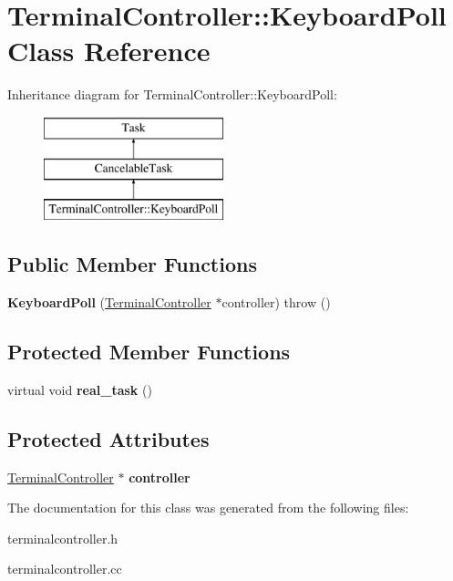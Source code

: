 \hypertarget{classTerminalController_1_1KeyboardPoll}{
\section{TerminalController::KeyboardPoll Class Reference}
\label{classTerminalController_1_1KeyboardPoll}
}
Inheritance diagram for TerminalController::KeyboardPoll:\begin{figure}[H]
\begin{center}
\leavevmode
\includegraphics[height=3cm]{classTerminalController_1_1KeyboardPoll}
\end{center}
\end{figure}
\subsection*{Public Member Functions}
\begin{DoxyCompactItemize}
\item 
\hypertarget{classTerminalController_1_1KeyboardPoll_a5367155da125738f1a92d91a602390f9}{
{\bfseries KeyboardPoll} (\hyperlink{classTerminalController}{TerminalController} $\ast$controller)  throw ()}
\label{classTerminalController_1_1KeyboardPoll_a5367155da125738f1a92d91a602390f9}

\end{DoxyCompactItemize}
\subsection*{Protected Member Functions}
\begin{DoxyCompactItemize}
\item 
\hypertarget{classTerminalController_1_1KeyboardPoll_a1af4db6a3ba3b4aaabc7eb72c76b7397}{
virtual void {\bfseries real\_\-task} ()}
\label{classTerminalController_1_1KeyboardPoll_a1af4db6a3ba3b4aaabc7eb72c76b7397}

\end{DoxyCompactItemize}
\subsection*{Protected Attributes}
\begin{DoxyCompactItemize}
\item 
\hypertarget{classTerminalController_1_1KeyboardPoll_a4661060e5cf2cdabd9ba416da0d27d2c}{
\hyperlink{classTerminalController}{TerminalController} $\ast$ {\bfseries controller}}
\label{classTerminalController_1_1KeyboardPoll_a4661060e5cf2cdabd9ba416da0d27d2c}

\end{DoxyCompactItemize}


The documentation for this class was generated from the following files:\begin{DoxyCompactItemize}
\item 
terminalcontroller.h\item 
terminalcontroller.cc\end{DoxyCompactItemize}
